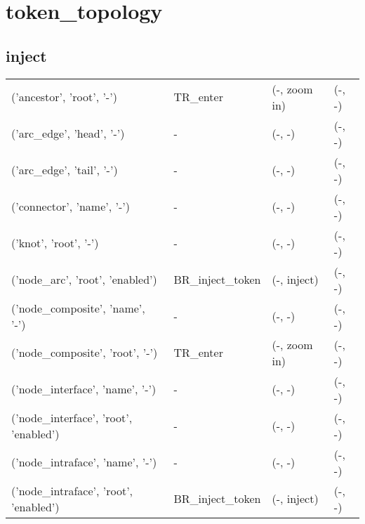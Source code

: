 \def\state#1{#1}
\def\object#1{#1}
\def\cursor#1{#1}
\def\leftnextstate#1{#1}
\def\leftaction#1{#1}
\def\rightnextstate#1{#1}
\def\rightaction#1{#1}
\section{token\_topology}
\subsection{inject}
\begin{tabular}{|l|l|l|l|}
\object{('ancestor', 'root', '-')} &\cursor{TR\_enter} &(\leftnextstate{-}, \leftaction{zoom in}) &(\rightnextstate{-}, \rightaction{-})\\
\object{('arc\_edge', 'head', '-')} &\cursor{-} &(\leftnextstate{-}, \leftaction{-}) &(\rightnextstate{-}, \rightaction{-})\\
\object{('arc\_edge', 'tail', '-')} &\cursor{-} &(\leftnextstate{-}, \leftaction{-}) &(\rightnextstate{-}, \rightaction{-})\\
\object{('connector', 'name', '-')} &\cursor{-} &(\leftnextstate{-}, \leftaction{-}) &(\rightnextstate{-}, \rightaction{-})\\
\object{('knot', 'root', '-')} &\cursor{-} &(\leftnextstate{-}, \leftaction{-}) &(\rightnextstate{-}, \rightaction{-})\\
\object{('node\_arc', 'root', 'enabled')} &\cursor{BR\_inject\_token} &(\leftnextstate{-}, \leftaction{inject}) &(\rightnextstate{-}, \rightaction{-})\\
\object{('node\_composite', 'name', '-')} &\cursor{-} &(\leftnextstate{-}, \leftaction{-}) &(\rightnextstate{-}, \rightaction{-})\\
\object{('node\_composite', 'root', '-')} &\cursor{TR\_enter} &(\leftnextstate{-}, \leftaction{zoom in}) &(\rightnextstate{-}, \rightaction{-})\\
\object{('node\_interface', 'name', '-')} &\cursor{-} &(\leftnextstate{-}, \leftaction{-}) &(\rightnextstate{-}, \rightaction{-})\\
\object{('node\_interface', 'root', 'enabled')} &\cursor{-} &(\leftnextstate{-}, \leftaction{-}) &(\rightnextstate{-}, \rightaction{-})\\
\object{('node\_intraface', 'name', '-')} &\cursor{-} &(\leftnextstate{-}, \leftaction{-}) &(\rightnextstate{-}, \rightaction{-})\\
\object{('node\_intraface', 'root', 'enabled')} &\cursor{BR\_inject\_token} &(\leftnextstate{-}, \leftaction{inject}) &(\rightnextstate{-}, \rightaction{-})\\

\end{tabular}
